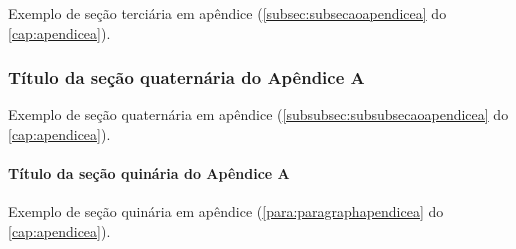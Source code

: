 Exemplo de seção terciária em apêndice (\autoref{subsec:subsecaoapendicea} do \autoref{cap:apendicea}).

\subsubsection{Título da seção quaternária do Apêndice A}\label{subsubsec:subsubsecaoapendicea}

Exemplo de seção quaternária em apêndice (\autoref{subsubsec:subsubsecaoapendicea} do \autoref{cap:apendicea}).

\paragraph{Título da seção quinária do Apêndice A}\label{para:paragraphapendicea}

Exemplo de seção quinária em apêndice (\autoref{para:paragraphapendicea} do \autoref{cap:apendicea}).
